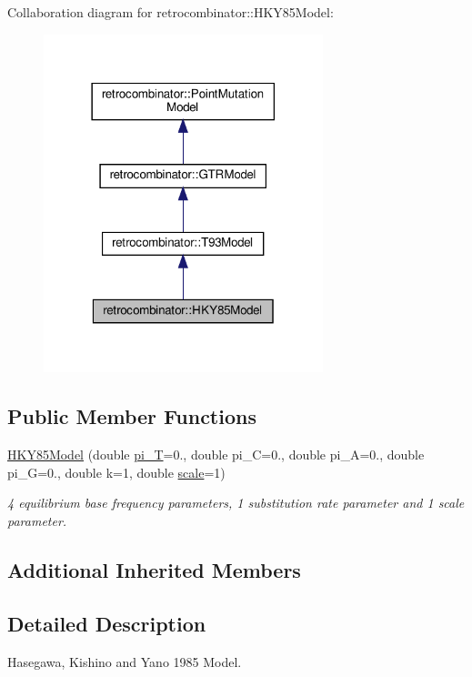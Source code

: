 Collaboration diagram for retrocombinator\+:\+:H\+K\+Y85\+Model\+:
\nopagebreak
\begin{figure}[H]
\begin{center}
\leavevmode
\includegraphics[width=230pt]{classretrocombinator_1_1HKY85Model__coll__graph}
\end{center}
\end{figure}
\subsection*{Public Member Functions}
\begin{DoxyCompactItemize}
\item 
\hyperlink{classretrocombinator_1_1HKY85Model_a2f4a296cdc444c92b54a4d972b044cdb}{H\+K\+Y85\+Model} (double \hyperlink{classretrocombinator_1_1GTRModel_ab002dbc62f8e8fbfc94558dd94166bd8}{pi\+\_\+T}=0., double pi\+\_\+C=0., double pi\+\_\+A=0., double pi\+\_\+G=0., double k=1, double \hyperlink{classretrocombinator_1_1PointMutationModel_a3258dfbdae0f2614cdc66f13ae028b46}{scale}=1)
\begin{DoxyCompactList}\small\item\em 4 equilibrium base frequency parameters, 1 substitution rate parameter and 1 scale parameter. \end{DoxyCompactList}\end{DoxyCompactItemize}
\subsection*{Additional Inherited Members}


\subsection{Detailed Description}
Hasegawa, Kishino and Yano 1985 Model. 

